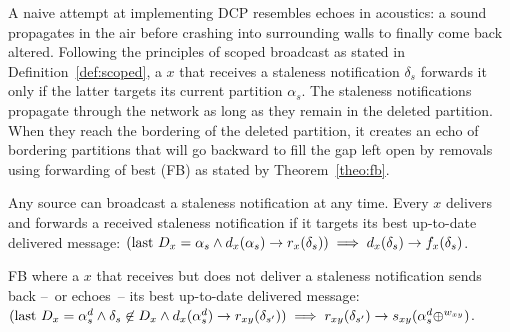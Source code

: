 \newcommand{\last}{\textup{last}~}

A naive attempt at implementing DCP resembles echoes in acoustics: a
sound propagates in the air before crashing into surrounding walls to
finally come back altered. Following the principles of scoped
broadcast as stated in Definition~\ref{def:scoped}, a \process $x$
that receives a staleness notification $\delta_s$ forwards it only if
the latter targets its current partition $\alpha_s$. The staleness
notifications propagate through the network as long as they remain in
the deleted partition. When they reach the bordering \processes of the
deleted partition, it creates an echo of bordering partitions that
will go backward to fill the gap left open by removals using
forwarding of best (FB) as stated by Theorem~\ref{theo:fb}.



\begin{definition}
  Any source can broadcast a staleness notification at any
  time. Every \process $x$ delivers and forwards a received staleness
  notification if it targets its best up-to-date delivered message:
  $(\last D_x = \alpha_s \wedge d_x(\alpha_s) \rightarrow
  r_x(\delta_s)) \implies d_x(\delta_s) \rightarrow f_x(\delta_s)$.
\end{definition}

\begin{definition} FB where
  a \process $x$ that receives but does not deliver a staleness
  notification sends back --~or echoes~-- its best up-to-date
  delivered message: $(\last D_x = \alpha_s^d \wedge \delta_s
  \not\in D_x \wedge d_x(\alpha_s^d)\rightarrow r_{xy}(\delta_{s'}))
  \implies r_{xy}(\delta_{s'}) \rightarrow
  s_{xy}(\alpha_s^d\oplus^{w_{xy}})$.

  
\end{definition}

